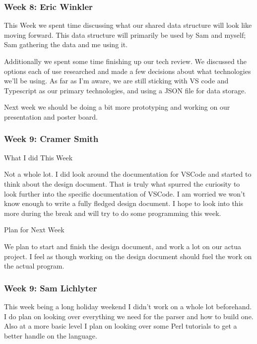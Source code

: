  \subsubsection{Week 8: Eric Winkler}

This Week we spent time discussing what our shared data structure will look like moving forward. This data structure will primarily be used by Sam and myself; Sam gathering the data and me using it.



Additionally we spent some time finishing up our tech review. We discussed the options each of use researched and made a few decisions about what technologies we'll be using. As far as I'm aware, we are still sticking with VS code and Typescript as our primary technologies, and using a JSON file for data storage.



Next week we should be doing a bit more prototyping and working on our presentation and poster board. \\ 

 \subsubsection{Week 9: Cramer Smith}

What I did This Week



Not a whole lot. I did look around the documentation for VSCode and started to think about the design document. That is truly what spurred the curiosity to look further into the specific documentation of VSCode. I am worried we won't know enough to write a fully fledged design document. I hope to look into this more during the break and will try to do some programming this week. 



Plan for Next Week



We plan to start and finish the design document, and work a lot on our actua project. I feel as though working on the design document should fuel the work on the actual program.   \\ 

 \subsubsection{Week 9: Sam Lichlyter}

This week being a long holiday weekend I didn't work on a whole lot beforehand. I do plan on looking over everything we need for the parser and how to build one. Also at a more basic level I plan on looking over some Perl tutorials to get a better handle on the language. 



